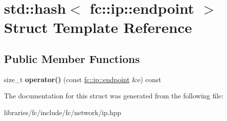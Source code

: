 \hypertarget{structstd_1_1hash_3_01fc_1_1ip_1_1endpoint_01_4}{}\section{std\+:\+:hash$<$ fc\+:\+:ip\+:\+:endpoint $>$ Struct Template Reference}
\label{structstd_1_1hash_3_01fc_1_1ip_1_1endpoint_01_4}
\subsection*{Public Member Functions}
\begin{DoxyCompactItemize}
\item 
\mbox{\label{structstd_1_1hash_3_01fc_1_1ip_1_1endpoint_01_4_a7d874df3e01cdb82556249143b8b2219}} 
size\+\_\+t {\bfseries operator()} (const \mbox{\hyperlink{classfc_1_1ip_1_1endpoint}{fc\+::ip\+::endpoint}} \&e) const
\end{DoxyCompactItemize}


The documentation for this struct was generated from the following file\+:\begin{DoxyCompactItemize}
\item 
libraries/fc/include/fc/network/ip.\+hpp\end{DoxyCompactItemize}

